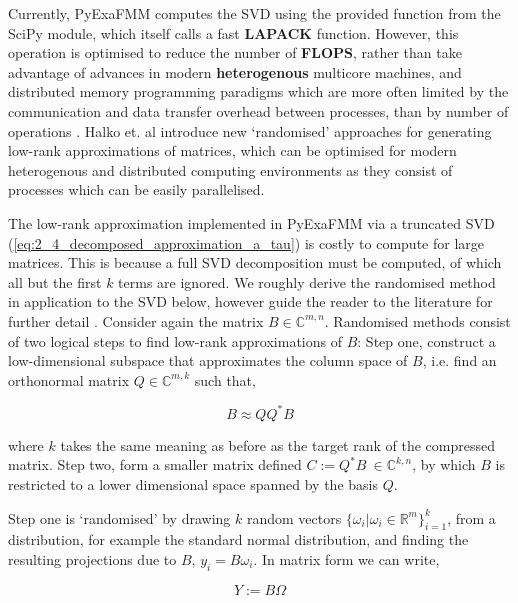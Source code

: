 Currently, \gls{PyExaFMM} computes the \gls{SVD} using the provided function
from the SciPy module, which itself calls a fast \textbf{\gls{LAPACK}}
function. However, this operation is optimised to reduce the number
of \textbf{\gls{FLOPS}}, rather than take advantage of advances in modern
\textbf{\gls{heterogenous}} multicore machines, and
distributed memory programming paradigms which are more often limited by the
communication and data transfer overhead between processes, than by number of
operations \cite{Halko:2011:SIAM}. Halko et. al introduce new `randomised'
approaches for generating low-rank approximations of matrices, which can be
optimised for modern heterogenous and distributed computing environments as they
consist of processes which can be easily parallelised.

The low-rank approximation implemented in \gls{PyExaFMM} via a truncated
\gls{SVD} (\ref{eq:2_4_decomposed_approximation_a_tau}) is costly to compute
for large matrices. This is because a full \gls{SVD} decomposition must be computed, of
which all but the first $k$ terms are ignored.
We roughly derive the randomised method in application to the \gls{SVD} below, however guide
the reader to the literature for further detail \cite{Erichson:2019:JOSS,Halko:2011:SIAM}.
Consider again the matrix $B \in \mathbb{C}^{m, n}$. Randomised methods consist
of two logical steps to find low-rank approximations of $B$: Step one, construct
a low-dimensional subspace that approximates the column space of $B$, i.e.
find an orthonormal matrix $Q \in \mathbb{C}^{m, k}$ such that,

\begin{equation}
    B \approx QQ^*B
    \label{eq:2_4_step_1_randomised}
\end{equation}

where $k$ takes the same meaning as before as the target rank of the compressed
matrix. Step two, form a smaller matrix defined $C := Q^*B \> \in \mathbb{C}^{k, n}$,
by which $B$ is restricted to a lower dimensional space spanned by the basis
$Q$.

Step one is `randomised' by drawing $k$ random vectors $\{ \omega_i | \omega_i \in \mathbb{R}^m \}_{i=1}^k$,
from a distribution, for example the standard normal distribution, and finding the
resulting projections due to $B$, $y_i = B \omega_i$. In matrix form we can write,

\begin{equation}
    Y := B \Omega
\end{equation}

